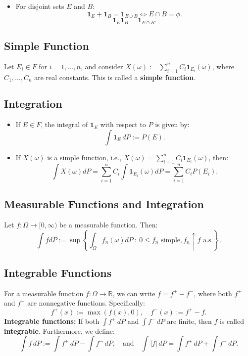 \documentclass{article}
\begin{document}
\begin{itemize}
    \item For disjoint sets $E$ and $B$: 
    \[    \mathbf{1}_E + \mathbf{1}_B = \mathbf{1}_{E \cup B}    \iff E\cap B = \phi.\]
    \[    \mathbf{1}_E \mathbf{1}_B = \mathbf{1}_{E \cap B}.\]
\end{itemize}

\subsection{Simple Function}
Let $E_i \in F$ for $i = 1, \dots, n$, and consider $X(\omega) := \sum_{i=1}^n C_i \mathbf{1}_{E_i}(\omega)$, where $C_1, \dots, C_n$ are real constants. This is called a \textbf{simple function}.

\subsection{Integration}
\begin{itemize}
    \item If $E \in F$, the integral of $\mathbf{1}_E$ with respect to $P$ is given by:
    \[\int \mathbf{1}_E \, dP := P(E).\]
    \item If $X(\omega)$ is a simple function, i.e., $X(\omega) = \sum_{i=1}^n C_i \mathbf{1}_{E_i}(\omega)$, then:
    \[\int X(\omega) dP = \sum_{i=1}^n C_i \int \mathbf{1}_{E_i}(\omega) dP = \sum_{i=1}^n C_i P(E_i).\]
\end{itemize}

\subsection{Measurable Functions and Integration}
Let $f : \Omega \to [0, \infty)$ be a measurable function. Then:
\[\int f dP := \sup \left\{ \int_\Omega f_n(\omega) dP \ : \ 0 \leq f_n \text{ simple}, f_n \uparrow f \text{ a.s.} \right\}.\]
\subsection{Integrable Functions}
For a measurable function $f : \Omega \to \mathbb{R}$, we can write $f = f^+ - f^-$, where both $f^+$ and $f^-$ are nonnegative functions. Specifically:
\[f^+(x) := \max(f(x), 0), \quad f^-(x) := f^+ - f.\]
\textbf{Integrable functions:} If both $\int f^+ \, dP$ and $\int f^- \, dP$ are finite, then $f$ is called \textbf{integrable}. Furthermore, we define:
\[\int f \, dP := \int f^+ \, dP - \int f^- \, dP, \quad \text{and} \quad \int |f| \, dP = \int f^+ \, dP + \int f^- \, dP.\]
\end{document}
